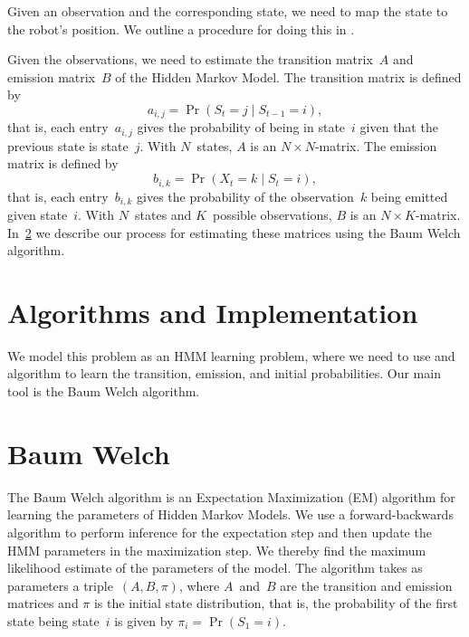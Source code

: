 \documentclass[twoside]{article}
\begin{document}
Given an observation and the corresponding state, we need to map the state to the robot's position.
We outline a procedure for doing this in . %

Given the observations, we need to estimate the transition matrix~$A$ and emission matrix~$B$ of the Hidden Markov Model.
The transition matrix is defined by
\begin{equation*}
  a_{i,j} = \Pr(S_{t} = j \mid S_{t-1} = i),
\end{equation*}
that is, each entry~$a_{i, j}$ gives the probability of being in state~$i$ given that the previous state is state~$j$.
With $N$~states, $A$ is an ${N \times N}$-matrix.
The emission matrix is defined by
\begin{equation*}
  b_{i, k} = \Pr(X_t = k \mid S_t = i),
\end{equation*}
that is, each entry~$b_{i, k}$ gives the probability of the observation~$k$ being emitted given state~$i$.
With $N$~states and $K$~possible observations, $B$ is an ${N \times K}$-matrix.
In~\cref{sec:baum-welch} we describe our process for estimating these matrices using the Baum Welch algorithm.

\section{Algorithms and Implementation}\label{sec:algo-and-impl}

We model this problem as an HMM learning problem, where we need to use and algorithm to learn the transition, emission, and initial probabilities.
Our main tool is the Baum Welch algorithm.


\section{Baum Welch}\label{sec:baum-welch}
The Baum Welch algorithm is an Expectation Maximization (EM) algorithm for learning the parameters of Hidden Markov Models.
We use a forward-backwards algorithm to perform inference for the expectation step and then update the HMM parameters in the maximization step.
We thereby find the maximum likelihood estimate of the parameters of the model.
The algorithm takes as parameters a triple~$(A, B, \pi)$, where $A$~and~$B$ are the transition and emission matrices and $\pi$ is the initial state distribution, that is, the probability of the first state being state~$i$ is given by ${\pi_i = \Pr(S_1 = i)}$.
\end{document}

